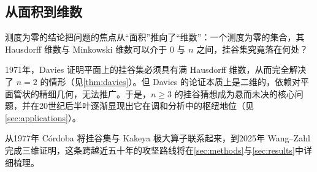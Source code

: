 \subsection{从面积到维数}

测度为零的结论把问题的焦点从“面积”推向了“维数”：一个测度为零的集合，其 Hausdorff 维数与 Minkowski 维数可以介于 $0$ 与 $n$ 之间，挂谷集究竟落在何处？

1971年，Davies 证明平面上的挂谷集必须具有满 Hausdorff 维数\cite{davies1971}，从而完全解决了 $n = 2$ 的情形（见\cref{thm:davies}）。但 Davies 的论证本质上是二维的，依赖对平面管状的精细几何，无法推广。于是，$n \ge 3$ 的挂谷猜想成为悬而未决的核心问题，并在20世纪后半叶逐渐显现出它在调和分析中的枢纽地位（见\cref{sec:applications}）。

从1977年 Córdoba 将挂谷集与 Kakeya 极大算子联系起来\cite{cordoba1977}，到2025年 Wang--Zahl 完成三维证明\cite{wangzahl2025}，这条跨越近五十年的攻坚路线将在\cref{sec:methods}与\cref{sec:results}中详细梳理。
